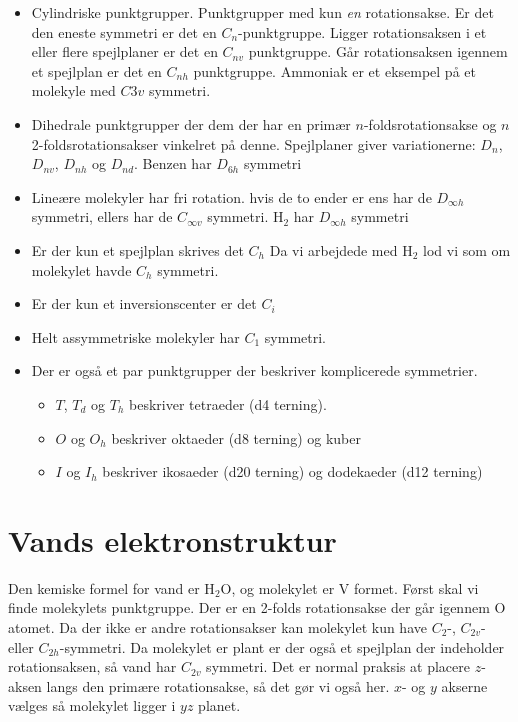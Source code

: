 \documentclass[../../Atom-ogMolekylefysik.tex]{subfiles}
\begin{document}
\begin{itemize}
    \item Cylindriske punktgrupper. Punktgrupper med kun {\em en} rotationsakse. Er det den eneste symmetri er det en $C_n$-punktgruppe. Ligger rotationsaksen i et eller flere spejlplaner er det en $C_{nv}$ punktgruppe. Går rotationsaksen igennem et spejlplan er det en $C_{nh}$ punktgruppe. Ammoniak er et eksempel på et molekyle med $C{3v}$ symmetri.
    \item Dihedrale punktgrupper der dem der har en primær $n$-foldsrotationsakse og $n$ 2-foldsrotationsakser vinkelret på denne. Spejlplaner giver variationerne: $D_n$, $D_{nv}$, $D_{nh}$ og $D_{nd}$. Benzen har $D_{6h}$ symmetri
    \item Lineære molekyler har fri rotation. hvis de to ender er ens har de $D_{\infty h}$ symmetri, ellers har de $C_{\infty v}$ symmetri. H$_2$ har $D_{\infty h}$ symmetri
    \item Er der kun et spejlplan skrives det $C_h$ Da vi arbejdede med H$_2$ lod vi som om molekylet havde $C_h$ symmetri.
    \item Er der kun et inversionscenter er det $C_i$
    \item Helt assymmetriske molekyler har $C_1$ symmetri.
    \item Der er også et par punktgrupper der beskriver komplicerede symmetrier. 
    \begin{itemize}
    \item $T$, $T_d$ og $T_h$ beskriver tetraeder  (d4 terning).
    \item $O$ og $O_h$ beskriver oktaeder (d8 terning) og kuber
    \item $I$ og $I_h$ beskriver ikosaeder (d20 terning) og dodekaeder (d12 terning)
    \end{itemize}
\end{itemize}

\section{Vands elektronstruktur}
Den kemiske formel for vand er H$_2$O, og molekylet er V formet. Først skal vi finde molekylets punktgruppe. Der er en 2-folds rotationsakse der går igennem O atomet. Da der ikke er andre rotationsakser kan molekylet kun have $C_2$-, $C_{2v}$- eller $C_{2h}$-symmetri. Da molekylet er plant er der også et spejlplan der indeholder rotationsaksen, så vand har $C_{2v}$ symmetri. Det er normal praksis at placere $z$-aksen langs den primære rotationsakse, så det gør vi også her. $x$- og $y$ akserne vælges så molekylet ligger i $yz$ planet.
\end{document}
